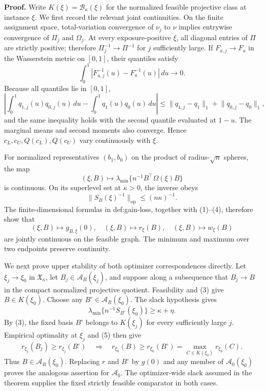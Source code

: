 \textbf{Proof.}
Write \(K(\xi)=\mathcal B_\kappa(\xi)\) for the normalized feasible projective class at instance \(\xi\).  We first record the relevant joint continuities.  On the finite assignment space, total-variation convergence of \(\nu_j\) to \(\nu\) implies entrywise convergence of \(\Pi_j\) and \(\Omega_j\).  At every exposure-positive \(\xi\), all diagonal entries of \(\Pi\) are strictly positive; therefore \(\Pi_j^{-1}\to\Pi^{-1}\) for \(j\) sufficiently large.  If \(F_{a,j}\to F_a\) in the Wasserstein metric on \([0,1]\), their quantiles satisfy
\[
\int_0^1\left|F_{a,j}^{-1}(u)-F_a^{-1}(u)\right|\,du\longrightarrow0.
\tag{1}
\]
Because all quantiles lie in \([0,1]\),
\[
\left|\int_0^1q_{1,j}(u)q_{0,j}(u)\,du-
\int_0^1q_1(u)q_0(u)\,du\right|
\le \lVert q_{1,j}-q_1\rVert_1+\lVert q_{0,j}-q_0\rVert_1,
\tag{2}
\]
and the same inequality holds with the second quantile evaluated at \(1-u\).  The marginal means and second moments also converge.  Hence \(c_L,c_U,Q(c_L),Q(c_U)\) vary continuously with \(\xi\).

For normalized representatives \((b_1,b_0)\) on the product of radius-\(\sqrt n\) spheres, the map
\[
(\xi,B)\longmapsto \lambda_{\min}\{n^{-1}B^{\top}\Omega(\xi)B\}
\tag{3}
\]
is continuous.  On its superlevel set at \(\kappa>0\), the inverse obeys
\[
\lVert S_B(\xi)^{-1}\rVert_{\mathrm{op}}\le(n\kappa)^{-1}.
\tag{4}
\]
The finite-dimensional formulas in def:gain-loss, together with (1)--(4), therefore show that
\[
(\xi,B)\longmapsto g_{B,\xi}(0),\quad
(\xi,B)\longmapsto r_\xi(B),\quad
(\xi,B)\longmapsto w_\xi(B)
\tag{5}
\]
are jointly continuous on the feasible graph.  The minimum and maximum over two endpoints preserve continuity.

We next prove upper stability of both optimizer correspondences directly.  Let \(\xi_j\to\xi_0\) in \(\mathfrak X_\kappa\), let \(B_j\in\mathcal A_R(\xi_j)\), and suppose along a subsequence that \(B_j\to B\) in the compact normalized projective quotient.  Feasibility and (3) give \(B\in K(\xi_0)\).  Choose any \(B^\circ\in\mathcal A_R(\xi_0)\).  The slack hypothesis gives
\[
\lambda_{\min}\{n^{-1}S_{B^\circ}(\xi_0)\}\ge\kappa+\eta.
\]
By (3), the fixed basis \(B^\circ\) belongs to \(K(\xi_j)\) for every sufficiently large \(j\).  Empirical optimality at \(\xi_j\) and (5) then give
\[
r_{\xi_j}(B_j)\ge r_{\xi_j}(B^\circ)
\quad\Longrightarrow\quad
r_{\xi_0}(B)\ge r_{\xi_0}(B^\circ)=\max_{C\in K(\xi_0)}r_{\xi_0}(C).
\]
Thus \(B\in\mathcal A_R(\xi_0)\).  Replacing \(r\) and \(B^\circ\) by \(g(0)\) and any member of \(\mathcal A_0(\xi_0)\) proves the analogous assertion for \(\mathcal A_0\).  The optimizer-wide slack assumed in the theorem supplies the fixed strictly feasible comparator in both cases.

